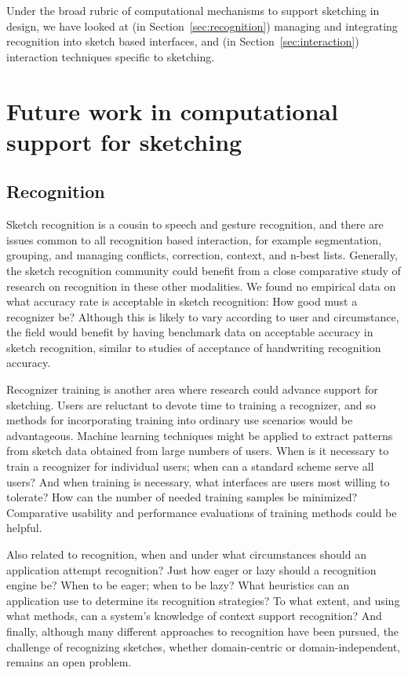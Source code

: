 Under the broad rubric of computational mechanisms to support
sketching in design, we have looked at (in
Section~\ref{sec:recognition}) managing and integrating recognition
into sketch based interfaces, and (in Section~\ref{sec:interaction})
interaction techniques specific to sketching.

\section{Future work in computational support for sketching}

\subsection{Recognition}

Sketch recognition is a cousin to speech and gesture recognition, and
there are issues common to all recognition based interaction, for
example segmentation, grouping, and managing conflicts, correction,
context, and n-best lists. Generally, the sketch recognition community
could benefit from a close comparative study of research on
recognition in these other modalities. We found no empirical data on
what accuracy rate is acceptable in sketch recognition: How good must
a recognizer be? Although this is likely to vary according to user and
circumstance, the field would benefit by having benchmark data on
acceptable accuracy in sketch recognition, similar to studies of
acceptance of handwriting recognition accuracy.

Recognizer training is another area where research could advance
support for sketching. Users are reluctant to devote time to training
a recognizer, and so methods for incorporating training into ordinary
use scenarios would be advantageous. Machine learning techniques might
be applied to extract patterns from sketch data obtained from large
numbers of users. When is it necessary to train a recognizer for
individual users; when can a standard scheme serve all users? And when
training is necessary, what interfaces are users most willing to
tolerate? How can the number of needed training samples be minimized?
Comparative usability and performance evaluations of training methods
could be helpful.

Also related to recognition, when and under what circumstances should
an application attempt recognition? Just how eager or lazy should a
recognition engine be? When to be eager; when to be lazy? What
heuristics can an application use to determine its recognition
strategies? To what extent, and using what methods, can a system's
knowledge of context support recognition? And finally, although many
different approaches to recognition have been pursued, the challenge
of recognizing sketches, whether domain-centric or domain-independent,
remains an open problem. 


